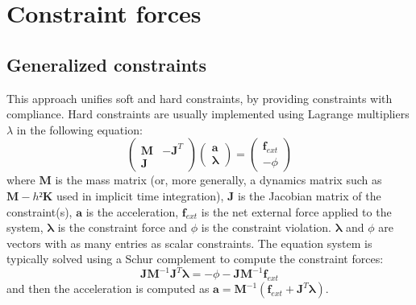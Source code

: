 \newcommand{\vect}[1]{\mathbf{#1}}
\newcommand{\mat}[1]{\mathbf{#1}}

\newcommand{\pos}{\vect{x}}
\newcommand{\dx}{\vect{\Delta x}}
\newcommand{\xcur}{\vect{x}_{n}}
\newcommand{\xnext}{\vect{x}_{n+1}}
\newcommand{\vel}{\vect{v}}
\newcommand{\dv}{\vect{\Delta v}}
\newcommand{\vcur}{\vect{v}_{n}}
\newcommand{\vnext}{\vect v_{n+1}}
\newcommand{\acc}{\vect{a}}
\newcommand{\force}{\vect{f}}
\newcommand{\forcext}{\vect{f}_{ext}} 
\newcommand{\lam}{\vect{\lambda}}
\newcommand{\lcur}{\lam_{n}}
\newcommand{\lnext}{\lam_{n+1}}
\newcommand{\avlam}{\bar{\lam}}
\newcommand{\fcur}{\vect{f}_{n}}
\newcommand{\fnext}{\vect f_{n+1}}
\newcommand{\M}{\mat M}
\newcommand{\Minv}{\mat M^{-1}}
\renewcommand{\P}{\mat P}
\newcommand{\J}{\mat J}
\newcommand{\Jt}{\mat J^T}
\newcommand{\C}{\mat C}
\newcommand{\K}{\mat K}
\newcommand{\violation}{ \phi}
\newcommand{\dviolation}{\dot \violation}
\newcommand{\violcur}{\violation_{n}}
\newcommand{\dviolcur}{\dot \violcur}
\newcommand{\violnext}{\violation_{n+1}}
\newcommand{\dviolnext}{\dot \violation_{n+1}}
\newcommand{\cmp}{c}
\newcommand{\dampingratio}{d}


\section{Constraint forces}
\subsection{Generalized constraints}
This approach unifies soft and hard constraints, by providing constraints with compliance. Hard constraints are usually implemented using Lagrange multipliers $\lambda$ in the following equation:
\begin{equation} \label{eq acc hard}
\left( \begin{array}{cc}
\M & -\Jt \\
 \J &  \end{array}\right)
\left( \begin{array}{c}
\acc \\ \lam
\end{array}\right) = \left( \begin{array}{c}
\forcext  \\
-\violation
\end{array}\right) 
\end{equation}
where $\M$ is the mass matrix (or, more generally, a dynamics matrix such as $\M-h²\K$ used in implicit time integration), $\J$ is the Jacobian matrix of the constraint(s), $\acc$ is the acceleration, $\forcext$ is the net external force applied to the system, $\lam$ is the constraint force and $\violation$ is the constraint violation.
$\lam$ and $\violation$ are vectors with as many entries as scalar constraints. The equation system is typically solved using a Schur complement to compute the constraint forces:
\begin{equation}\label{eq schur rigid}
\J \Minv \Jt \lam = -\violation - \J \Minv \forcext
\end{equation}
and then the acceleration is computed as $\acc = \Minv( \forcext + \Jt \lam)$.


